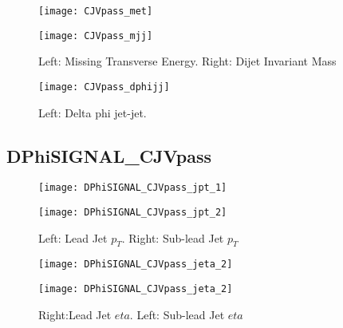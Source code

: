 \documentclass[a4paper,10pt]{article}
\begin{document}
\begin{figure}[!h]
\centering
\begin{minipage}[!h]{0.4\linewidth}
\centering
\texttt{[image: CJVpass\_met]}
\end{minipage}%
\begin{minipage}[!h]{0.4\linewidth}
\centering
\texttt{[image: CJVpass\_mjj]}
\end{minipage}
\caption{Left: Missing Transverse Energy. Right: Dijet Invariant Mass}
\end{figure}

\begin{figure}[!h]
\centering
\begin{minipage}[!h]{0.4\linewidth}
\centering
\texttt{[image: CJVpass\_dphijj]}
\end{minipage}%
\begin{minipage}[!h]{0.4\linewidth}
\centering
\end{minipage}
\caption{Left: Delta phi jet-jet.}
\end{figure}

\clearpage
\subsection{DPhiSIGNAL\_CJVpass}

\begin{figure}[!h]
\centering
\begin{minipage}[!h]{0.4\linewidth}
\centering
\texttt{[image: DPhiSIGNAL\_CJVpass\_jpt\_1]}
\end{minipage}%
\begin{minipage}[!h]{0.4\linewidth}
  \texttt{[image: DPhiSIGNAL\_CJVpass\_jpt\_2]}
\end{minipage}
\caption{Left: Lead Jet $p_T$. Right: Sub-lead Jet $p_T$}
\end{figure}

\begin{figure}[!h]
\centering
\begin{minipage}[!h]{0.4\linewidth}
\centering
\texttt{[image: DPhiSIGNAL\_CJVpass\_jeta\_2]}
\end{minipage}%
\begin{minipage}[!h]{0.4\linewidth}
\centering
\texttt{[image: DPhiSIGNAL\_CJVpass\_jeta\_2]}
\end{minipage}
\caption{Right:Lead Jet $eta$. Left: Sub-lead Jet $eta$}
\end{figure}
\end{document}
